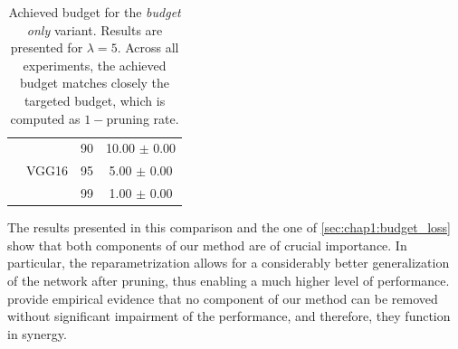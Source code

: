 \begin{table}
\begin{tabular}{lllc}
                              & \multirow{3}{*}{VGG16}    & 90                         & 10.00 $\pm$ 0.00 \\
                              &                           & 95                         & 5.00 $\pm$ 0.00  \\
                              &                           & 99                         & 1.00 $\pm$ 0.00  \\
    \bottomrule
  \end{tabular}
  \caption{Achieved budget for the \emph{budget only} variant. Results are
    presented for $\lambda=5$. Across all experiments, the achieved budget matches
    closely the targeted budget, which is computed as $1-$pruning
    rate.}
  \label{tab:chap1:impact_of_reparametrisation}
\end{table}



The results presented in this comparison and the one of
\cref{sec:chap1:budget_loss} show that both components of our method are of
crucial importance. In particular, the reparametrization allows for a
considerably better generalization of the network after pruning, thus enabling a
much higher level of performance.
provide empirical evidence that no component of our method can be removed
without significant impairment of the performance, and therefore, they
function in synergy.


